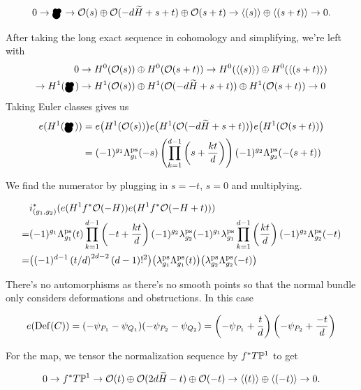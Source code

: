 \documentclass[12pt]{memoir}
\newcommand{\Mickey}{\pre{\raisebox{-1mm}{\scalebox{1.3}{\ensuremath\bullet}}}\hspace{-2.3 mm}{\raisebox{-1.65mm}{\scalebox{2.1}{\ensuremath\bullet}}}^{\hspace{-2.1mm}\raisebox{-1mm}{\scalebox{1.3}{\ensuremath\bullet}}}}
\begin{document}
\[0\to \Mickey\to \cO(s)\oplus\cO(-d\widetilde{H}+s+t)\oplus\cO(s+t)\to\genr{(s)}\oplus\genr{(s+t)}\to 0.\]

After taking the long exact sequence in cohomology and simplifying, we're left with
\begin{align*}
    0                & \to H^0(\cO(s))\oplus H^0(\cO(s+t))\to H^0(\genr{(s)})\oplus H^0(\genr{(s+t)}) \\
    \to H^1(\Mickey) & \to H^1(\cO(s))\oplus H^1(\cO(-d\widetilde{H}+s+t))\oplus H^1(\cO(s+t))\to 0
\end{align*}
Taking Euler classes gives us
\begin{align*}
    e(H^1(\Mickey)) & =e\bigl(H^1(\cO(s))\bigr)e\bigl(H^1(\cO(-d\widetilde{H}+s+t))\bigr)e\bigl(H^1(\cO(s+t))\bigr)                            \\
                    & =(-1)^{g_1}\La_{g_1}^{\ps}(-s)\left(\prod_{k=1}^{d-1}\left(s+\frac{kt}{d}\right)\right)(-1)^{g_2}\La_{g_2}^{\ps}(-(s+t))
\end{align*}

We find the numerator by plugging in \(s=-t\), \(s=0\) and multiplying.

\begin{align*}
      & i_{(g_1,g_2)}^\ast(e(H^1f^\ast\mathcal{O}(-H))e(H^1f^\ast\mathcal{O}(-H+t)))                                                                                                                                       \\
    = & (-1)^{g_1}\Lambda_{g_1}^{\operatorname{\mathrm{ps}}}(t)\prod_{k=1}^{d-1}\left(-t+\frac{kt}{d}\right)(-1)^{g_2}\lambda_{g_2}^{\operatorname{\mathrm{ps}}}(-1)^{g_1}\lambda_{g_1}^{\operatorname{\mathrm{ps}}}\prod_{k=1}^{d-1}\left(\frac{kt}{d}\right)(-1)^{g_2}\Lambda_{g_2}^{\operatorname{\mathrm{ps}}}(-t) \\
    = & \bigl((-1)^{d-1}\left({t}/{d}\right)^{2d-2}(d-1)!^2\bigr)\bigl(\lambda_{g_1}^{\operatorname{\mathrm{ps}}}\Lambda_{g_1}^{\operatorname{\mathrm{ps}}}(t)\bigr)\bigl(\lambda_{g_2}^{\operatorname{\mathrm{ps}}}\Lambda_{g_2}^{\operatorname{\mathrm{ps}}}(-t)\bigr)
\end{align*}

There's no automorphisms as there's no smooth points so that the normal bundle only considers deformations and obstructions. In this case

\[e(\operatorname{Def}(C))=(-\psi_{P_1}-\psi_{Q_1})(-\psi_{P_2}-\psi_{Q_2})=\left(-\psi_{P_1}+\frac{t}{d}\right)\left(-\psi_{P_2}+\frac{-t}{d}\right)\]

For the map, we tensor the normalization sequence by \(f^\ast T\mathbb{P}^1\) to get

\[0\to f^\ast T\mathbb{P}^1\to \mathcal{O}(t)\oplus\mathcal{O}(2d\widetilde{H}-t)\oplus\mathcal{O}(-t)\to\left\langle (t)\right\rangle\oplus\left\langle (-t)\right\rangle\to 0.\]
\end{document}
